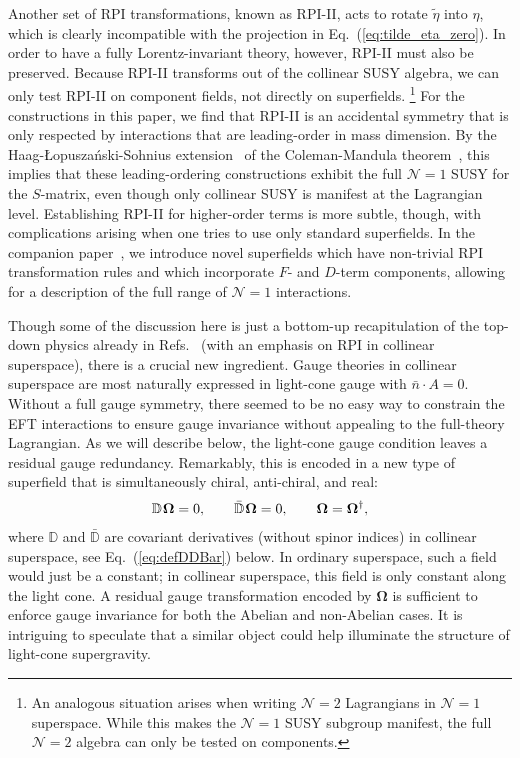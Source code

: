 \documentclass[12pt,document,nofootinbib,superscriptaddress,onecolumn,preprintnumbers,balancelastpage]{article}
\newcommand{\s}{\hspace{0.8pt}}
\DeclareRobustCommand{\Eq}[1]{Eq.~(\ref{#1})}
\DeclareRobustCommand{\Refs}[1]{Refs.~\cite{#1}}
\newcommand{\D}{\mathbb{D}}
\newcommand{\RCA}{\boldsymbol{\Omega}}
\begin{document}
\begin{spacing}{1.2}
Another set of RPI transformations, known as RPI-II, acts to rotate $\tilde{\eta}$ into $\eta$,  which is clearly incompatible with the projection in \Eq{eq:tilde_eta_zero}.
%
In order to have a fully Lorentz-invariant theory, however, RPI-II must also be preserved.
%
Because RPI-II transforms out of the collinear SUSY algebra, we can only test RPI-II on component fields, not directly on superfields.%
%
\footnote{An analogous situation arises when writing $\mathcal{N}=2$ Lagrangians in $\mathcal{N}=1$ superspace.  While this makes the $\mathcal{N}=1$ SUSY subgroup manifest, the full $\mathcal{N}=2$ algebra can only be tested on components.}
%
For the constructions in this paper, we find that RPI-II is an accidental symmetry that is only respected by  interactions that are leading-order in mass dimension. 
%
By the Haag-\L opusza\'nski-Sohnius extension~\cite{Haag:1974qh} of the Coleman-Mandula theorem~\cite{Coleman:1967ad}, this implies that these leading-ordering constructions exhibit the full $\mathcal{N}=1$ SUSY for the $S$-matrix, even though only collinear SUSY is manifest at the Lagrangian level.
%
Establishing RPI-II for higher-order terms is more subtle, though, with complications arising when one tries to use only standard superfields. 
%
In the companion paper~\cite{Cohen:2019gsc}, we introduce novel superfields which have non-trivial RPI transformation rules and which incorporate $F$- and $D$-term components, allowing for a description of the full range of $\mathcal{N} = 1$ interactions.


Though some of the discussion here is just a bottom-up recapitulation of the top-down physics already in \Refs{Cohen:2016jzp, Cohen:2016dcl} (with an emphasis on RPI in collinear superspace), there is a crucial new ingredient.
%
Gauge theories in collinear superspace are most naturally expressed in light-cone gauge with $\bar{n} \cdot A = 0$.
%
Without a full gauge symmetry, there seemed to be no easy way to constrain the EFT interactions to ensure gauge invariance without appealing to the full-theory Lagrangian.
%
As we will describe below, the light-cone gauge condition leaves a residual gauge redundancy.
%
Remarkably, this is encoded in a new type of superfield that is simultaneously chiral, anti-chiral, and real:
%
\vspace{-3mm}
\begin{align}
\D\s \RCA = 0, \qquad \bar{\D}\s \RCA = 0, \qquad \RCA = \RCA^\dagger,
\end{align}
%
where $\D$ and $\bar{\D}$ are covariant derivatives (without spinor indices) in collinear superspace, see \Eq{eq:defDDBar} below.
%
In ordinary superspace, such a field would just be a constant; in collinear superspace, this field is only constant along the light cone.
%
A residual gauge transformation encoded by $\RCA$ is sufficient to enforce gauge invariance for both the Abelian and non-Abelian cases.
%
It is intriguing to speculate that a similar object could help illuminate the structure of light-cone supergravity.



\end{spacing}
\end{document}
